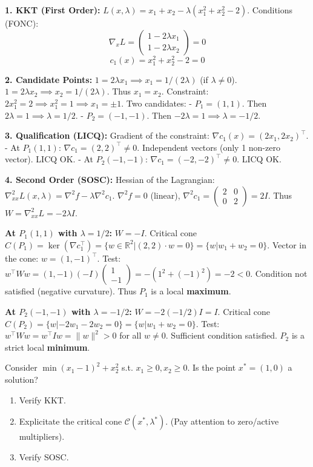 \begin{correction}
\textbf{1. KKT (First Order):}
$L(x, \lambda) = x_1 + x_2 - \lambda(x_1^2 + x_2^2 - 2)$.
Conditions (FONC):
$$ \nabla_x L = \begin{pmatrix} 1 - 2\lambda x_1 \\ 1 - 2\lambda x_2 \end{pmatrix} = 0 $$
$$ c_1(x) = x_1^2 + x_2^2 - 2 = 0 $$

\textbf{2. Candidate Points:}
$1 = 2\lambda x_1 \implies x_1 = 1/(2\lambda)$ (if $\lambda \ne 0$).
$1 = 2\lambda x_2 \implies x_2 = 1/(2\lambda)$.
Thus $x_1 = x_2$.
Constraint: $2x_1^2 = 2 \implies x_1^2 = 1 \implies x_1 = \pm 1$.
Two candidates:
- $P_1 = (1, 1)$. Then $2\lambda = 1 \implies \lambda = 1/2$.
- $P_2 = (-1, -1)$. Then $-2\lambda = 1 \implies \lambda = -1/2$.

\textbf{3. Qualification (LICQ):}
Gradient of the constraint: $\nabla c_1(x) = (2x_1, 2x_2)^\top$.
- At $P_1(1,1)$: $\nabla c_1 = (2, 2)^\top \ne 0$. Independent vectors (only 1 non-zero vector). LICQ OK.
- At $P_2(-1,-1)$: $\nabla c_1 = (-2, -2)^\top \ne 0$. LICQ OK.

\textbf{4. Second Order (SOSC):}
Hessian of the Lagrangian: $\nabla_{xx}^2 L(x, \lambda) = \nabla^2 f - \lambda \nabla^2 c_1$.
$\nabla^2 f = 0$ (linear), $\nabla^2 c_1 = \begin{pmatrix} 2 & 0 \\ 0 & 2 \end{pmatrix} = 2I$.
Thus $W = \nabla_{xx}^2 L = -2\lambda I$.

\textbf{At $P_1(1,1)$ with $\lambda = 1/2$:}
$W = -I$.
Critical cone $C(P_1) = \ker(\nabla c_1^\top) = \{ w \in \mathbb{R}^2 | (2, 2) \cdot w = 0 \} = \{ w | w_1 + w_2 = 0 \}$.
Vector in the cone: $w = (1, -1)^\top$.
Test: $w^\top W w = (1, -1) (-I) \begin{pmatrix} 1 \\ -1 \end{pmatrix} = - (1^2 + (-1)^2) = -2 < 0$.
Condition not satisfied (negative curvature). Thus $P_1$ is a local \textbf{maximum}.

\textbf{At $P_2(-1,-1)$ with $\lambda = -1/2$:}
$W = -2(-1/2)I = I$.
Critical cone $C(P_2) = \{ w | -2w_1 - 2w_2 = 0 \} = \{ w | w_1 + w_2 = 0 \}$.
Test: $w^\top W w = w^\top I w = \|w\|^2 > 0$ for all $w \ne 0$.
Sufficient condition satisfied. $P_2$ is a strict local \textbf{minimum}.
\end{correction}
\bigskip

\bigskip
\begin{exercice}
Consider $\min (x_1 - 1)^2 + x_2^2$ s.t. $x_1 \ge 0, x_2 \ge 0$.
Is the point $x^* = (1, 0)$ a solution?
\begin{enumerate}
    \item Verify KKT.
    \item Explicitate the critical cone $\mathcal{C}(x^*, \lambda^*)$. (Pay attention to zero/active multipliers).
    \item Verify SOSC.
\end{enumerate}
\end{exercice}

